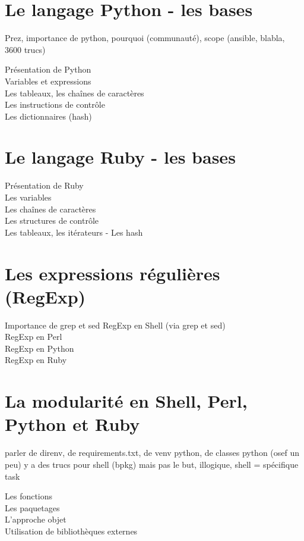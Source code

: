 \documentclass[11pt,a4paper]{article}
\begin{document}
\section{Le langage Python - les bases}
Prez, importance de python, pourquoi (communauté), scope (ansible, blabla, 3600 trucs)

Présentation de Python\\
Variables et expressions\\
Les tableaux, les chaînes de caractères\\
Les instructions de contrôle\\
Les dictionnaires (hash)\\

\section{Le langage Ruby - les bases}
Présentation de Ruby\\
Les variables\\
Les chaînes de caractères\\
Les structures de contrôle\\
Les tableaux, les itérateurs - Les hash\\

\section{Les expressions régulières (RegExp)}
Importance de grep et sed 
RegExp en Shell (via grep et sed)\\
RegExp en Perl\\
RegExp en Python\\
RegExp en Ruby\\

\section{La modularité en Shell, Perl, Python et Ruby}

parler de direnv, de requirements.txt, de venv python, de classes python (osef un peu)
y a des trucs pour shell (bpkg) mais pas le but, illogique, shell = spécifique task

Les fonctions\\
Les paquetages\\
L'approche objet\\
Utilisation de bibliothèques externes\\
\end{document}
